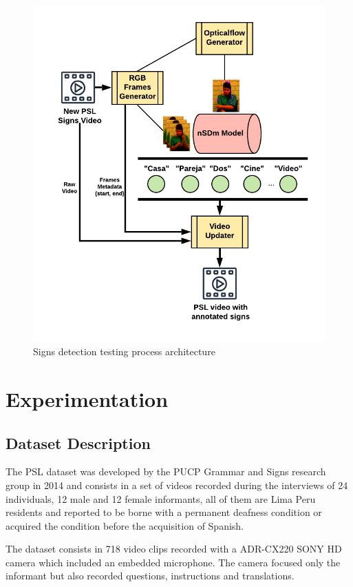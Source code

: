 \documentclass[twocolumn,conference]{article}
\begin{document}
\begin{figure}[hbt!]
\includegraphics[width=\linewidth]{images/new-video-test-architecture.png}
\caption{Signs detection testing process architecture}
\label{fig:opticalflow-two}
\end{figure}

\section{Experimentation}\label{experimentation}
\subsection{Dataset Description \cite{lsp_dataset}}\label{datasetdesc}
The PSL dataset was developed by the PUCP Grammar and Signs research group in 2014 and consists in a set of videos recorded during the interviews of 24 individuals, 12 male and 12 female informants, all of them are Lima Peru residents and reported to be borne with a permanent deafness condition or acquired the condition before the acquisition of Spanish. 

The dataset consists in 718 video clips recorded with a ADR-CX220 SONY HD camera which included an embedded microphone. The camera focused only the informant but also recorded questions, instructions and translations.
\end{document}
